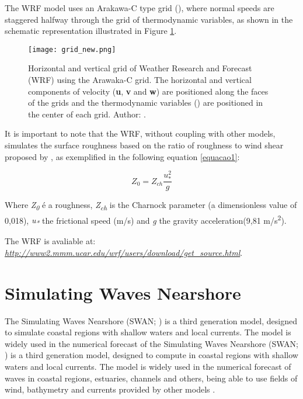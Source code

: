 \noindent The WRF model uses an Arakawa-C type grid (\cite{Arakawa1977}), where normal speeds are staggered halfway through the grid of thermodynamic variables, as shown in the 
schematic representation illustrated in Figure \textcolor{bleu_cite}{\ref{gradeswrf}}.
\bigskip

\begin{figure}[H]
    \centering
    \texttt{[image: grid\_new.png]}
    \caption{Horizontal and vertical grid of Weather Research and Forecast (WRF) using the Arawaka-C grid. The horizontal and vertical components
                        of velocity (\textbf{u}, \textbf{v} and \textbf{w}) are positioned along the faces of the grids and the thermodynamic variables
                        (\straighttheta) are positioned in the center of each grid. \newline Author: \textcite{Skamarock2008}.}
    \label{gradeswrf}
\end{figure}
\bigskip

\noindent It is important to note that the WRF, without coupling with other models, simulates the surface roughness based on the ratio of roughness to wind 
shear proposed by \textcite{Charnock1955}, as exemplified in the following equation \textcolor{bleu_cite}{\ref{equacao1}}:
\bigskip

\begin{equation}
Z_{0} = Z_{ch} \frac{u_{*}^{2}}{g}
\label{equacao1}
\end{equation}

\bigskip

\noindent Where \textit{Z\textsubscript{0}} é a roughness, \textit{Z\textsubscript{ch}} is the Charnock parameter (a dimensionless value of 0,018), \textit{u\textsubscript{*}} 
the frictional speed (m/s) and \textit{g} the gravity acceleration(9,81 m/s\textsuperscript{2}).
\bigskip

\noindent The WRF is avaliable at: \textcolor{bleu_cite}{\href{http://www2.mmm.ucar.edu/wrf/users/download/get\_source.html}{\textit{http://www2.mmm.ucar.edu/wrf/users/download/get\_source.html}}}.
\bigskip


\section{Simulating Waves Nearshore}\label{swansecao}
\bigskip

\noindent The Simulating Waves Nearshore (SWAN; \cite{Booij1999, Booij1996}) is a third generation model,
designed to simulate coastal regions with shallow waters and local currents. The model is widely used in the numerical forecast of the Simulating Waves Nearshore (SWAN; \cite{Booij1999, Booij1996}) is a third generation model,
designed to compute in coastal regions with shallow waters and local currents. The model is widely used in the numerical forecast of waves in coastal regions, estuaries,  channels and 
others, being able to use fields of wind, bathymetry and currents provided by other models \parencite{Booij1999, Booij1996}.
\bigskip

